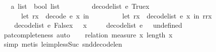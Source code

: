 \begin{isabellebody}
\ \ {\isasymRightarrow}\ {\isacharprime}{\kern0pt}a\ list\ {\isasymtimes}\ bool\ list{\isachardoublequoteclose}\ \isanewline
\ \ \ \isanewline
\ \ \ \ {\isachardoublequoteopen}decode{\isacharunderscore}{\kern0pt}list\ e\ {\isacharparenleft}{\kern0pt}True{\isacharhash}{\kern0pt}x{}{\isacharparenright}{\kern0pt}\ {\isacharequal}{\kern0pt}\ {\isacharparenleft}{\kern0pt}\isanewline
\ \ \ \ \ \ let\ {\isacharparenleft}{\kern0pt}r{}{\isacharcomma}{\kern0pt}x{}{\isacharparenright}{\kern0pt}\ {\isacharequal}{\kern0pt}\ decode\ e\ x{}\ in\ {\isacharparenleft}{\kern0pt}\isanewline
\ \ \ \ \ \ \ \ let\ {\isacharparenleft}{\kern0pt}r{}{\isacharcomma}{\kern0pt}x{}{\isacharparenright}{\kern0pt}\ {\isacharequal}{\kern0pt}\ decode{\isacharunderscore}{\kern0pt}list\ e\ x{}\ in\ {\isacharparenleft}{\kern0pt}r{}{\isacharhash}{\kern0pt}r{}{\isacharcomma}{\kern0pt}x{}{\isacharparenright}{\kern0pt}{\isacharparenright}{\kern0pt}{\isacharparenright}{\kern0pt}{\isachardoublequoteclose}\ {\isacharbar}{\kern0pt}\isanewline
\ \ \ \ {\isachardoublequoteopen}decode{\isacharunderscore}{\kern0pt}list\ e\ {\isacharparenleft}{\kern0pt}False{\isacharhash}{\kern0pt}x{}{\isacharparenright}{\kern0pt}\ {\isacharequal}{\kern0pt}\ {\isacharparenleft}{\kern0pt}{\isacharbrackleft}{\kern0pt}{\isacharbrackright}{\kern0pt}{\isacharcomma}{\kern0pt}\ x{}{\isacharparenright}{\kern0pt}{\isachardoublequoteclose}\ {\isacharbar}{\kern0pt}\isanewline
\ \ \ \ {\isachardoublequoteopen}decode{\isacharunderscore}{\kern0pt}list\ e\ {\isacharbrackleft}{\kern0pt}{\isacharbrackright}{\kern0pt}\ {\isacharequal}{\kern0pt}\ undefined{\isachardoublequoteclose}\isanewline
%
\isadelimproof
\ \ %
\endisadelimproof
%
\isatagproof
{}\isamarkupfalse%
\ pat{\isacharunderscore}{\kern0pt}completeness\ auto%
\endisatagproof
{\isafoldproof}%
%
\isadelimproof
\isanewline
%
\endisadelimproof
{}\isamarkupfalse%
\isanewline
%
\isadelimproof
\ \ %
\endisadelimproof
%
\isatagproof
{}\isamarkupfalse%
\ {\isacharparenleft}{\kern0pt}relation\ {\isachardoublequoteopen}measure\ {\isacharparenleft}{\kern0pt}{\isasymlambda}{\isacharparenleft}{\kern0pt}{\isacharunderscore}{\kern0pt}{\isacharcomma}{\kern0pt}x{\isacharparenright}{\kern0pt}{\isachardot}{\kern0pt}\ length\ x{\isacharparenright}{\kern0pt}{\isachardoublequoteclose}{\isacharparenright}{\kern0pt}\isanewline
\ \ \isamarkupfalse%
\ {\isacharparenleft}{\kern0pt}simp{\isacharplus}{\kern0pt}{\isacharcomma}{\kern0pt}\ metis\ le{\isacharunderscore}{\kern0pt}imp{\isacharunderscore}{\kern0pt}less{\isacharunderscore}{\kern0pt}Suc\ snd{\isacharunderscore}{\kern0pt}decode{\isacharunderscore}{\kern0pt}len{\isacharparenright}{\kern0pt}%

\end{isabellebody}
